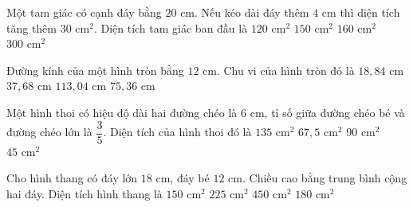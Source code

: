 \begin{ex} %
Một tam giác có cạnh đáy bằng $20\text{ cm}$. Nếu kéo dài đáy thêm $4\text{ cm}$ thì diện tích tăng thêm $30\text{ cm}^2$. Diện tích tam giác ban đầu là
\choice
{$120\text{ cm}^2$}
{\True $150\text{ cm}^2$}
{$160\text{ cm}^2$}
{$300\text{ cm}^2$}
\end{ex}

\begin{ex} %
Đường kính của một hình tròn bằng $12\text{ cm}$. Chu vi của hình tròn đó là
\choice
{$18{,}84\text{ cm}$}
{\True $37{,}68\text{ cm}$}
{$113{,}04\text{ cm}$}
{$75{,}36\text{ cm}$}
\end{ex}

\begin{ex} %
Một hình thoi có hiệu độ dài hai đường chéo là $6\text{ cm}$, tỉ số giữa đường chéo bé và đường chéo lớn là $\dfrac{3}{5}$. Diện tích của hình thoi đó là
\choice
{$135\text{ cm}^2$}
{\True $67{,}5\text{ cm}^2$}
{$90\text{ cm}^2$}
{$45\text{ cm}^2$}
\end{ex}

\begin{ex} %
Cho hình thang có đáy lớn $18\text{ cm}$, đáy bé $12\text{ cm}$. Chiều cao bằng trung bình cộng hai đáy. Diện tích hình thang là
\choice
{$150\text{ cm}^2$}
{\True $225\text{ cm}^2$}
{$450\text{ cm}^2$}
{$180\text{ cm}^2$}
\end{ex}

